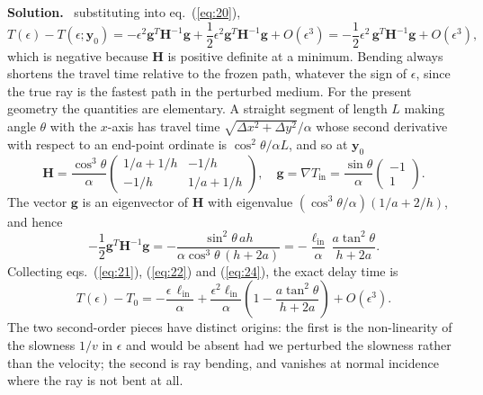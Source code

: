 \documentclass[a4paper,12pt]{paper}
\newenvironment{solution}{\par\noindent\textbf{Solution.}\ }{\par\medskip}
\begin{document}
\begin{solution}
substituting into eq.~(\ref{eq:20}),
\begin{equation}
    T(\epsilon) - T(\epsilon;\mathbf{y}_{0}) = -\epsilon^{2}\mathbf{g}^{T}\mathbf{H}^{-1}\mathbf{g}
    + \frac{1}{2}\epsilon^{2}\mathbf{g}^{T}\mathbf{H}^{-1}\mathbf{g} + O(\epsilon^{3})
    = -\frac{1}{2}\epsilon^{2}\,\mathbf{g}^{T}\mathbf{H}^{-1}\mathbf{g} + O(\epsilon^{3}),
    \label{eq:22}
\end{equation}
which is negative because $\mathbf{H}$ is positive definite at a minimum. Bending always shortens
the travel time relative to the frozen path, whatever the sign of $\epsilon$, since the true ray is
the fastest path in the perturbed medium. For the present geometry the quantities are elementary. A
straight segment of length $L$ making angle $\theta$ with the $x$-axis has travel time
$\sqrt{\Delta x^{2}+\Delta y^{2}}/\alpha$ whose second derivative with respect to an end-point
ordinate is $\cos^{2}\theta/\alpha L$, and so at $\mathbf{y}_{0}$
\begin{equation}
    \mathbf{H} = \frac{\cos^{3}\theta}{\alpha}\begin{pmatrix} 1/a+1/h & -1/h \\ -1/h & 1/a+1/h \end{pmatrix},\quad
    \mathbf{g} = \nabla T_{\mathrm{in}} = \frac{\sin\theta}{\alpha}\begin{pmatrix} -1 \\ 1 \end{pmatrix}.
    \label{eq:23}
\end{equation}
The vector $\mathbf{g}$ is an eigenvector of $\mathbf{H}$ with eigenvalue $(\cos^{3}\theta/\alpha)(1/a+2/h)$,
and hence
\begin{equation}
    -\frac{1}{2}\mathbf{g}^{T}\mathbf{H}^{-1}\mathbf{g} = -\frac{\sin^{2}\theta\,ah}{\alpha\cos^{3}\theta\,(h+2a)}
    = -\frac{\ell_{\mathrm{in}}}{\alpha}\,\frac{a\tan^{2}\theta}{h+2a}.
    \label{eq:24}
\end{equation}
Collecting eqs.~(\ref{eq:21}), (\ref{eq:22}) and (\ref{eq:24}), the exact delay time is
\begin{equation}
    T(\epsilon)-T_{0} = -\frac{\epsilon\,\ell_{\mathrm{in}}}{\alpha}
    + \frac{\epsilon^{2}\ell_{\mathrm{in}}}{\alpha}\left(1 - \frac{a\tan^{2}\theta}{h+2a}\right) + O(\epsilon^{3}).
    \label{eq:25}
\end{equation}
The two second-order pieces have distinct origins: the first is the non-linearity of the slowness
$1/v$ in $\epsilon$ and would be absent had we perturbed the slowness rather than the velocity; the
second is ray bending, and vanishes at normal incidence where the ray is not bent at all.


\end{solution}
\end{document}
